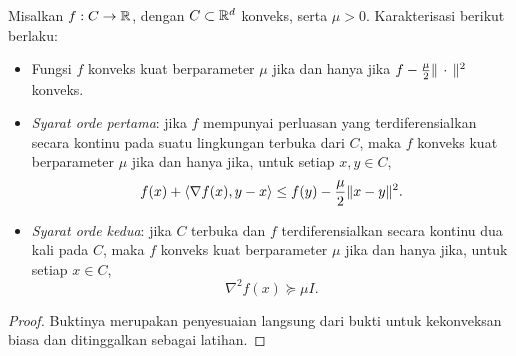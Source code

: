 \begin{theorem}
    Misalkan $f:C\rightarrow\mathbb{R}$, dengan $C\subset\mathbb{R}^d$ konveks, serta
    $\mu>0$. Karakterisasi berikut berlaku:
    \begin{itemize}
        \item Fungsi $f$ konveks kuat berparameter $\mu$ jika dan hanya jika
        $f-\frac{\mu}{2}\|\,\cdot\,\|^2$ konveks.
        \item \emph{Syarat orde pertama}: jika $f$ mempunyai perluasan yang
        terdiferensialkan secara kontinu pada suatu lingkungan terbuka dari
        $C$, maka $f$ konveks kuat berparameter $\mu$ jika dan hanya jika, untuk
        setiap $x,y\in C$,
        \[
            f(x)+\left\langle\nabla f(x) , y-x\right\rangle\leq f(y)-\frac{\mu}{2}\|x-y\|^2.
        \]
        \item \emph{Syarat orde kedua}: jika $C$ terbuka dan $f$
        terdiferensialkan secara kontinu dua kali pada $C$, maka $f$ konveks
        kuat berparameter $\mu$ jika dan hanya jika, untuk setiap $x\in C$,
        \[
            \nabla^2 f(x)\succeq\mu I.
        \]
    \end{itemize}
\end{theorem}
\begin{proof}
    Buktinya merupakan penyesuaian langsung dari bukti untuk kekonveksan biasa dan ditinggalkan sebagai latihan.
\end{proof}
